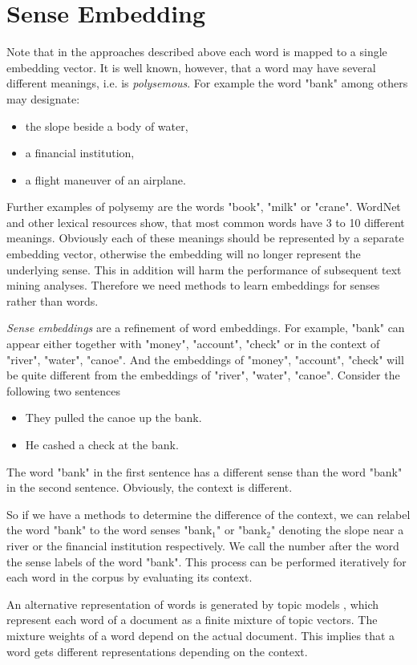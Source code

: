 \section{Sense Embedding}
Note that in the approaches described above each word is mapped to a single embedding vector. It is well known, however, that a word may have several different meanings, i.e. is \emph{polysemous}. For example the word "bank" among others may designate: 
\begin{itemize}
	\item the slope beside a body of water,
	\item a financial institution,
	\item a flight maneuver of an airplane.
\end{itemize}
Further examples of polysemy are the words "book", "milk" or "crane".
WordNet \citep{Fellbaum1998} and other lexical resources show, that most common words have 3 to 10 different meanings.
Obviously each of these meanings should be represented by a separate embedding vector, otherwise the embedding will no longer represent the underlying sense. This in addition will harm the performance of subsequent text mining analyses. Therefore we need methods to learn  embeddings for senses rather than words.


\emph{Sense embeddings} are a refinement of word embeddings. For example, "bank" can appear either together with "money", "account", "check" or in the context of "river", "water", "canoe". And the embeddings of "money", "account", "check" will be quite different from the embeddings of "river", "water", "canoe". Consider the following two sentences 
\begin{itemize}
	\item They pulled the canoe up the bank.
	\item He cashed a check at the bank.
\end{itemize}
The word "bank" in the first sentence has a different sense than the word "bank" in the second sentence. Obviously, the context is different. 

So if we have a methods to determine the difference of the context, we can relabel the word "bank" to the word senses "bank$_1$" or "bank$_2$" denoting the slope near a river or the financial institution respectively. We call the number after the word the sense labels of the word "bank". This process can be performed iteratively for each word in the corpus by evaluating its context.

An alternative representation of words is generated by topic models \citep{BleiNgEtAl2003}, which represent each word of a document as a finite mixture of topic vectors. The mixture weights of a word depend on the actual document. This implies that a word gets different representations depending on the context. 

